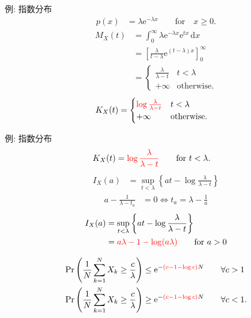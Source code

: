 \documentclass[lualatex,handout]{beamer}
\newcommand{\mycolor}[2]{%
  \begingroup
  \colorlet{currentcolor}{.}%
  \color{#1}#2%
  \color{currentcolor}%
  \endgroup
}
\newcommand{\emm}[1]{\mycolor{red}{#1}}
\newcommand\dx{{\,\mathrm{d}x}}
\theoremstyle{definition}
\begin{document}
\begin{frame}{例: 指数分布}
\begin{align*}
p(x) &= \lambda\mathrm{e}^{-\lambda x}\qquad\text{for}\quad x\ge 0.
\end{align*}
\begin{align*}
M_X(t) &= \int_{0}^\infty \lambda\mathrm{e}^{-\lambda x} \mathrm{e}^{tx}\dx\\
&=\left[\frac{\lambda}{t-\lambda}\mathrm{e}^{(t-\lambda)x}\right]_0^{\infty}\\
&=\begin{cases}
\frac{\lambda}{\lambda-t}& t < \lambda\\
+\infty&\text{otherwise.}
\end{cases}
\end{align*}
\begin{align*}
K_X(t) &=
\begin{cases}
\emm{\log\frac{\lambda}{\lambda-t}}& t < \lambda\\
+\infty&\text{otherwise.}
\end{cases}
\end{align*}
\end{frame}

\begin{frame}{例: 指数分布}
\small
\begin{align*}
K_X(t) &=
\emm{\log\frac{\lambda}{\lambda-t}}\qquad\text{for } t < \lambda.
\end{align*}
\begin{align*}
I_X(a) &= \sup_{t<\lambda} \left\{at - \log\frac{\lambda}{\lambda-t}\right\}
\end{align*}
\begin{align*}
a - \frac1{\lambda-t_a} &=0 \iff  t_a = \lambda-\frac1a
\end{align*}
\begin{align*}
I_X(a) &= \sup_{t<\lambda} \left\{at - \log\frac{\lambda}{\lambda-t}\right\}\\
&=
\emm{a\lambda - 1 - \log(a\lambda)}
\qquad\text{for } a> 0
\end{align*}

\begin{align*}
\Pr\left(\frac1N\sum_{k=1}^N X_k \ge \frac{c}{\lambda}\right) &\le \mathrm{e}^{-\emm{(c-1-\log c)}N} \qquad\forall c>1\\
\Pr\left(\frac1N\sum_{k=1}^N X_k \ge \frac{c}{\lambda}\right) &\ge \mathrm{e}^{-\emm{(c-1-\log c)}N} \qquad\forall c<1.
\end{align*}
\end{frame}
\end{document}
